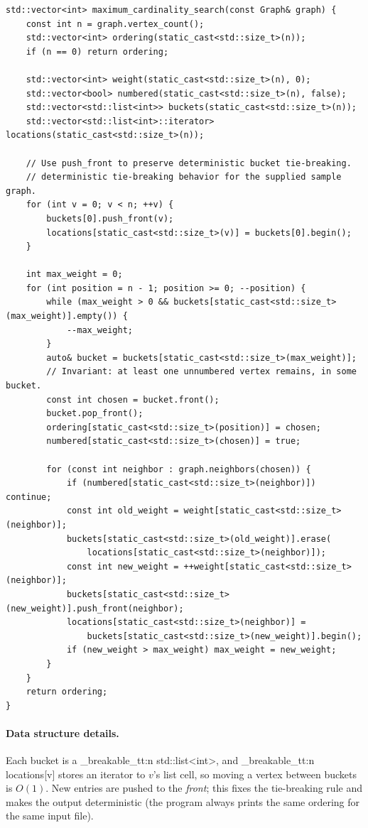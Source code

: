 \documentclass[11pt,a4paper,oneside]{report}
\theoremstyle{plain}
\theoremstyle{definition}
\theoremstyle{remark}
\DeclareRobustCommand{\code}[1]{\mtp_breakable_tt:n {#1}}
\DeclareRobustCommand{\file}[1]{\mtp_breakable_tt:n {#1}}
\begin{document}
\begin{lstlisting}[style=cpp,firstnumber=10,caption={\file{src/mcs.cpp}, lines 10--52: maximum cardinality search with bucket lists.},label={lst:mcs}]
std::vector<int> maximum_cardinality_search(const Graph& graph) {
    const int n = graph.vertex_count();
    std::vector<int> ordering(static_cast<std::size_t>(n));
    if (n == 0) return ordering;

    std::vector<int> weight(static_cast<std::size_t>(n), 0);
    std::vector<bool> numbered(static_cast<std::size_t>(n), false);
    std::vector<std::list<int>> buckets(static_cast<std::size_t>(n));
    std::vector<std::list<int>::iterator> locations(static_cast<std::size_t>(n));

    // Use push_front to preserve deterministic bucket tie-breaking.
    // deterministic tie-breaking behavior for the supplied sample graph.
    for (int v = 0; v < n; ++v) {
        buckets[0].push_front(v);
        locations[static_cast<std::size_t>(v)] = buckets[0].begin();
    }

    int max_weight = 0;
    for (int position = n - 1; position >= 0; --position) {
        while (max_weight > 0 && buckets[static_cast<std::size_t>(max_weight)].empty()) {
            --max_weight;
        }
        auto& bucket = buckets[static_cast<std::size_t>(max_weight)];
        // Invariant: at least one unnumbered vertex remains, in some bucket.
        const int chosen = bucket.front();
        bucket.pop_front();
        ordering[static_cast<std::size_t>(position)] = chosen;
        numbered[static_cast<std::size_t>(chosen)] = true;

        for (const int neighbor : graph.neighbors(chosen)) {
            if (numbered[static_cast<std::size_t>(neighbor)]) continue;
            const int old_weight = weight[static_cast<std::size_t>(neighbor)];
            buckets[static_cast<std::size_t>(old_weight)].erase(
                locations[static_cast<std::size_t>(neighbor)]);
            const int new_weight = ++weight[static_cast<std::size_t>(neighbor)];
            buckets[static_cast<std::size_t>(new_weight)].push_front(neighbor);
            locations[static_cast<std::size_t>(neighbor)] =
                buckets[static_cast<std::size_t>(new_weight)].begin();
            if (new_weight > max_weight) max_weight = new_weight;
        }
    }
    return ordering;
}
\end{lstlisting}

\paragraph{Data structure details.} Each bucket is a \code{std::list<int>}, and
\code{locations[v]} stores an iterator to \(v\)'s list cell, so moving a vertex between buckets
is \(O(1)\). New entries are pushed to the \emph{front}; this fixes the tie-breaking rule and
makes the output deterministic (the program always prints the same ordering for the same input
file).
\end{document}
